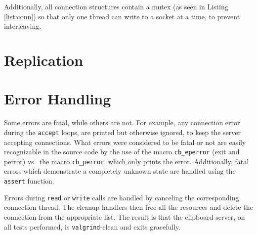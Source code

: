 \documentclass[a4paper, titlepage, english]{article}
\begin{document}
\par
Additionally, all connection structures contain a mutex (as seen in Listing \ref{list:conn}) so that only one thread can write to a socket at a time, to prevent interleaving.

\section{Replication}

\section{Error Handling}
\par
Some errors are fatal, while others are not. For example, any connection error during the \texttt{accept} loops, are printed but otherwise ignored, to keep the server accepting connections. What errors were considered to be fatal or not are easily recognizable in the source code by the use of the macro \texttt{cb\_eperror} (exit and perror) vs.\ the macro \texttt{cb\_perror}, which only prints the error. Additionally, fatal errors which demonstrate a completely unknown state are handled using the \texttt{assert} function.
\par
Errors during \texttt{read} or \texttt{write} calls are handled by canceling the corresponding connection thread. The cleanup handlers then free all the resources and delete the connection from the appropriate list. The result is that the clipboard server, on all tests performed, is \texttt{valgrind}-clean and exits gracefully.



\end{document}
